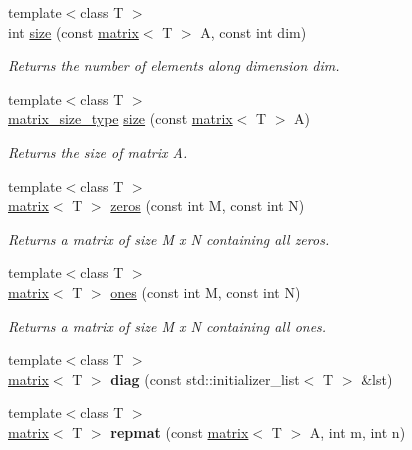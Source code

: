 \begin{DoxyCompactItemize}
\item 
{\footnotesize template$<$class T $>$ }\\int \hyperlink{namespacekeycpp_a2dc5102775ed955f378432f84fe96987}{size} (const \hyperlink{classkeycpp_1_1matrix}{matrix}$<$ T $>$ A, const int dim)
\begin{DoxyCompactList}\small\item\em Returns the number of elements along dimension dim. \end{DoxyCompactList}\item 
{\footnotesize template$<$class T $>$ }\\\hyperlink{structkeycpp_1_1matrix__size__type}{matrix\-\_\-size\-\_\-type} \hyperlink{namespacekeycpp_a028e501a865c86bdf616ea13e87645fa}{size} (const \hyperlink{classkeycpp_1_1matrix}{matrix}$<$ T $>$ A)
\begin{DoxyCompactList}\small\item\em Returns the size of matrix A. \end{DoxyCompactList}\item 
{\footnotesize template$<$class T $>$ }\\\hyperlink{classkeycpp_1_1matrix}{matrix}$<$ T $>$ \hyperlink{namespacekeycpp_a86f1406f9fad5a439d8eff01aba8eac6}{zeros} (const int M, const int N)
\begin{DoxyCompactList}\small\item\em Returns a matrix of size M x N containing all zeros. \end{DoxyCompactList}\item 
{\footnotesize template$<$class T $>$ }\\\hyperlink{classkeycpp_1_1matrix}{matrix}$<$ T $>$ \hyperlink{namespacekeycpp_ace6f21832ab61f8f15e5b35e0a5cdb3e}{ones} (const int M, const int N)
\begin{DoxyCompactList}\small\item\em Returns a matrix of size M x N containing all ones. \end{DoxyCompactList}\item 
\hypertarget{namespacekeycpp_a88b11f2372831ebb28fcd2a9961c4eab}{{\footnotesize template$<$class T $>$ }\\\hyperlink{classkeycpp_1_1matrix}{matrix}$<$ T $>$ {\bfseries diag} (const std\-::initializer\-\_\-list$<$ T $>$ \&lst)}\label{namespacekeycpp_a88b11f2372831ebb28fcd2a9961c4eab}

\item 
\hypertarget{namespacekeycpp_a40a637f210b03a3901cafbd6c1a7e83f}{{\footnotesize template$<$class T $>$ }\\\hyperlink{classkeycpp_1_1matrix}{matrix}$<$ T $>$ {\bfseries repmat} (const \hyperlink{classkeycpp_1_1matrix}{matrix}$<$ T $>$ A, int m, int n)}\label{namespacekeycpp_a40a637f210b03a3901cafbd6c1a7e83f}


\end{DoxyCompactItemize}
